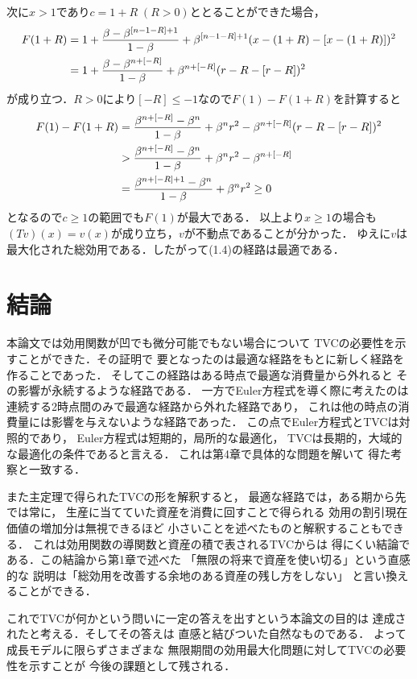 \documentclass[a4paper,11pt]{jsarticle}
\DeclareRobustCommand{\lfrac}[2]{{\lower.4ex\hbox{\begingroup\ensuremath{#1}\endgroup}\over{\hspace{.2mm}#2\hspace{.2mm}}}}
\begin{document}
次に$x>1$であり$c=1+R\;(R>0)$ととることができた場合，
\begin{align*}
	F(1+R)	&=1+\lfrac{\beta-\beta^{[n-1-R]+1}}{1-\beta}+\beta^{[n-1-R]+1}(x-(1+R)-[x-(1+R)])^2\\
			&=1+\lfrac{\beta-\beta^{n+[-R]}}{1-\beta}+\beta^{n+[-R]}(r-R-[r-R])^2
\end{align*}
が成り立つ．$R>0$により$[-R]\leq -1$なので$F(1)-F(1+R)$を計算すると
\begin{align*}
	F(1)-F(1+R)&=\lfrac{\beta^{n+[-R]}-\beta^n}{1-\beta}+\beta^nr^2-\beta^{n+[-R]}(r-R-[r-R])^2\\
				&>\lfrac{\beta^{n+[-R]}-\beta^n}{1-\beta}+\beta^nr^2-\beta^{n+[-R]}\\
				&=\lfrac{\beta^{n+[-R]+1}-\beta^n}{1-\beta}+\beta^nr^2 \geq 0
\end{align*}
となるので$c\geq 1$の範囲でも$F(1)$が最大である．
以上より$x\geq 1$の場合も$(Tv)(x)=v(x)$が成り立ち，$v$が不動点であることが分かった．
ゆえに$v$は最大化された総効用である．したがって(1.4)の経路は最適である．

\vspace{7mm}

\section{結論}

本論文では効用関数が凹でも微分可能でもない場合について
TVCの必要性を示すことができた．その証明で
要となったのは最適な経路をもとに新しく経路を作ることであった．
そしてこの経路はある時点で最適な消費量から外れると
その影響が永続するような経路である．
一方でEuler方程式を導く際に考えたのは
連続する2時点間のみで最適な経路から外れた経路であり，
これは他の時点の消費量には影響を与えないような経路であった．
この点でEuler方程式とTVCは対照的であり，
Euler方程式は短期的，局所的な最適化，
TVCは長期的，大域的な最適化の条件であると言える．
これは第4章で具体的な問題を解いて
得た考察と一致する．

また主定理で得られたTVCの形を解釈すると，
最適な経路では，ある期から先では常に，
生産に当てていた資産を消費に回すことで得られる
効用の割引現在価値の増加分は無視できるほど
小さいことを述べたものと解釈することもできる．
これは効用関数の導関数と資産の積で表されるTVCからは
得にくい結論である．この結論から第1章で述べた
「無限の将来で資産を使い切る」という直感的な
説明は「総効用を改善する余地のある資産の残し方をしない」
と言い換えることができる．

これでTVCが何かという問いに一定の答えを出すという本論文の目的は
達成されたと考える．そしてその答えは
直感と結びついた自然なものである．
よって成長モデルに限らずさまざまな
無限期間の効用最大化問題に対してTVCの必要性を示すことが
今後の課題として残される．
\end{document}
